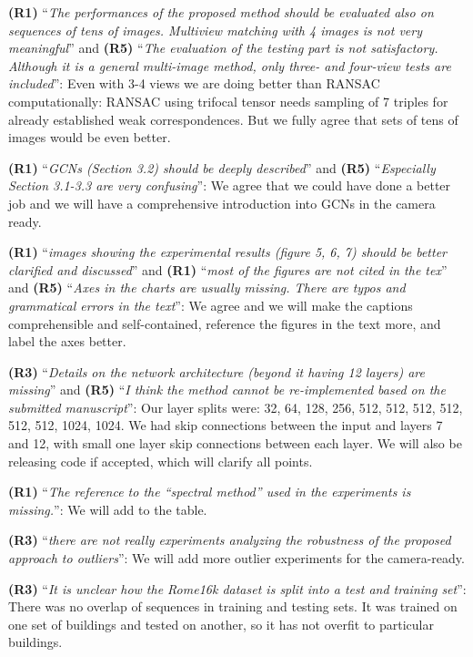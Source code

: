 \documentclass[10pt,twocolumn,letterpaper]{article}
\begin{document}
\textbf{(R1)} ``\textit{The performances of the proposed method should be evaluated also on sequences of tens of images. Multiview matching with 4 images is not very meaningful}'' and 
\textbf{(R5)} ``\textit{The evaluation of the testing part is not satisfactory. Although it is a general multi-image method, only three- and four-view tests are included}'':
Even with 3-4 views we are doing better than RANSAC computationally: RANSAC using trifocal tensor needs sampling of 7 triples for already established weak correspondences. But we fully agree that sets of tens of images would be even better.

\textbf{(R1)} ``\textit{GCNs (Section 3.2) should be deeply described}'' and
\textbf{(R5)} ``\textit{Especially Section 3.1-3.3 are very confusing}'':
We agree that we could have done a better job and we will have a comprehensive introduction into GCNs in the camera ready.

\textbf{(R1)} ``\textit{images showing the experimental results (figure 5, 6, 7) should be better clarified and discussed}'' and 
\textbf{(R1)} ``\textit{most of the figures are not cited in the tex}'' and
\textbf{(R5)} ``\textit{Axes in the charts are usually missing. There are typos and grammatical errors in the text}'':
We agree and we will make the captions comprehensible and self-contained, reference the figures in the text more, and label the axes better.

\textbf{(R3)} ``\textit{Details on the network architecture (beyond it having 12 layers) are missing}'' and 
\textbf{(R5)} ``\textit{I think the method cannot be re-implemented based on the submitted manuscript}'':
Our layer splits were: 32, 64, 128, 256, 512, 512, 512, 512, 512, 512, 1024, 1024. We had skip connections between the input and layers 7 and 12, with small one layer skip connections between each layer. We will also be releasing code if accepted, which will clarify all points.

\textbf{(R1)} ``\textit{The reference to the “spectral method” used in the experiments is missing.}'': 
We will add \cite{pachauri2013solving} to the table.

\textbf{(R3)} ``\textit{there are not really experiments analyzing the robustness of the proposed approach to outliers}'':
We will add more outlier experiments for the camera-ready. 

\textbf{(R3)} ``\textit{It is unclear how the Rome16k dataset is split into a test and training set}'':
There was no overlap of sequences in training and testing sets. It was trained on one set of buildings and tested on another, so it has not overfit to particular buildings.
\end{document}
